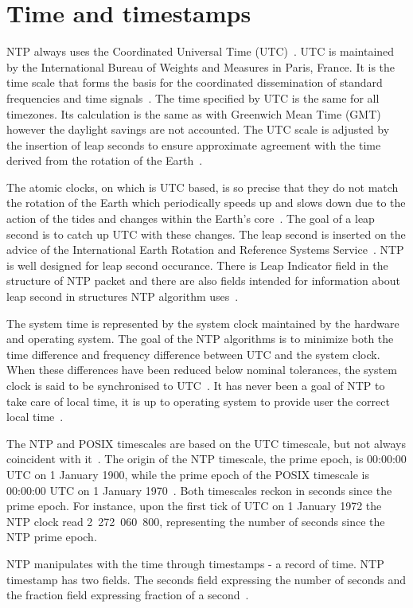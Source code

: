 
\section{Time and timestamps}\label{sec:ntp-time}
NTP always uses the Coordinated Universal Time (UTC)~\cite{rfc5905}.
UTC is maintained by the International Bureau of Weights and Measures in Paris, France.
It is the time scale that forms the basis for the coordinated dissemination of standard frequencies and time signals~\cite{bipm-utc}.
The time specified by UTC is the same for all timezones.
Its calculation is the same as with Greenwich Mean Time (GMT) however
the daylight savings are not accounted.
The UTC scale is adjusted by the insertion of leap seconds to ensure approximate
agreement with the time derived from the rotation of the Earth~\cite{bipm-utc}.

The atomic clocks, on which is UTC based, is so precise that
they do not match the rotation of the Earth
which periodically speeds up and slows down due to the action
of the tides and changes within the Earth's core~\cite{cnn-earth}.
The goal of a leap second is to catch up UTC with these changes.
The leap second is inserted on the advice of the International Earth Rotation and Reference Systems Service~\cite{bipm-utc}.
NTP is well designed for leap second occurance.
There is Leap Indicator field
in the structure of NTP packet and there are also fields intended for
information about leap second in structures NTP algorithm uses~\cite{rfc5905}.

The system time is represented by the system clock maintained by
the hardware and operating system.
The goal of the NTP algorithms is to minimize
both the time difference and frequency difference between UTC and the system clock.
When these differences have been reduced below nominal
tolerances, the system clock is said to be synchronised to UTC~\cite{rfc5905}.
It has never been a goal of NTP to take care of local time,
it is up to operating system to provide user the correct local time~\cite{ntp-overview}.

The NTP and POSIX timescales are based on the UTC timescale,
but not always coincident with it~\cite{ntp-leap}.
The origin of the NTP timescale, the prime epoch, is 00:00:00 UTC on 1 January 1900,
while the prime epoch of the POSIX timescale is 00:00:00 UTC on 1 January 1970~\cite{ntp-leap}.
Both timescales reckon in seconds since the prime epoch.
For instance, upon the first tick of UTC on 1 January 1972 the NTP clock read 2~272~060~800,
representing the number of seconds since the NTP prime epoch.

NTP manipulates with the time through timestamps - a record of time.
NTP timestamp has two fields. The seconds field expressing the number of seconds
and the fraction field expressing fraction of a second~\cite{rfc5905}.
